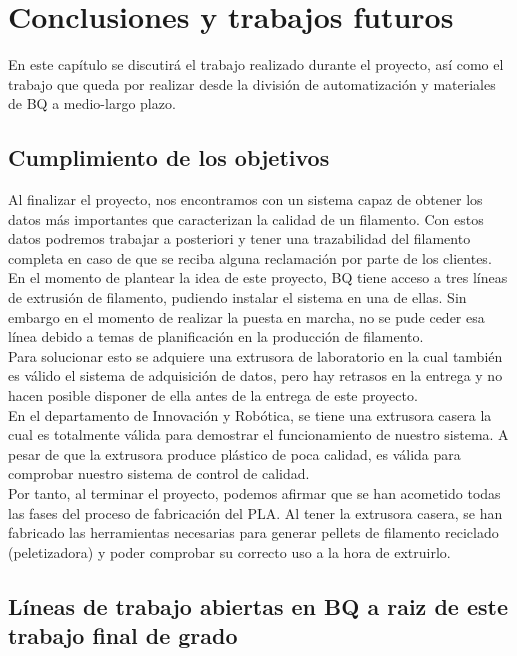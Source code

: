 \chapter{Conclusiones y trabajos futuros}
\label{cap:conclus}

En este capítulo se discutirá el trabajo realizado durante el proyecto, así como el trabajo que queda por realizar desde la división de automatización y materiales de BQ a medio-largo plazo.

\section{Cumplimiento de los objetivos}

Al finalizar el proyecto, nos encontramos con un sistema capaz de obtener los datos más importantes que caracterizan la calidad de un filamento. Con estos datos podremos trabajar a posteriori y tener una trazabilidad del filamento completa en caso de que se reciba alguna reclamación por parte de los clientes.\\

En el momento de plantear la idea de este proyecto, BQ tiene acceso a tres líneas de extrusión de filamento,  pudiendo instalar el sistema en una de ellas. Sin embargo en el momento de realizar la puesta en marcha, no se pude ceder esa línea debido a temas de planificación en la producción de filamento.\\

Para solucionar esto se adquiere una extrusora de laboratorio en la cual también es válido el sistema de adquisición de datos, pero hay retrasos en la entrega y no hacen posible disponer de ella antes de la entrega de este proyecto.\\

En el departamento de Innovación y Robótica, se tiene una extrusora casera la cual es totalmente válida para demostrar el funcionamiento de nuestro sistema. A pesar de que la extrusora produce plástico de poca calidad, es válida para comprobar nuestro sistema de control de calidad.\\

Por tanto, al terminar  el proyecto, podemos afirmar que se han acometido todas las fases del proceso de fabricación del PLA. Al tener la extrusora casera, se han fabricado las herramientas necesarias para generar pellets de filamento reciclado (peletizadora) y poder comprobar su correcto uso a la hora de extruirlo.

\section{Líneas de trabajo abiertas en BQ a raiz de este trabajo final de grado}

